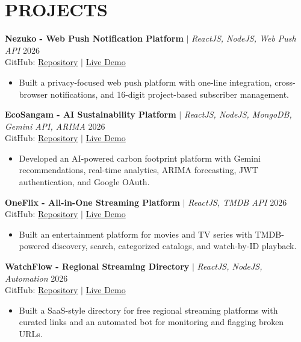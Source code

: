 \documentclass[a4paper,10pt]{article}
\begin{document}
\section*{PROJECTS}

\textbf{Nezuko - Web Push Notification Platform} $|$ \textit{ReactJS, NodeJS, Web Push API} \hfill 2026\\
GitHub: \href{https://github.com/rathod-ramraj/nezukoo}{Repository} $\mid$ \href{https://nezukoo.vercel.app/}{Live Demo}
\begin{itemize}
    \item Built a privacy-focused web push platform with one-line integration, cross-browser notifications, and 16-digit project-based subscriber management.
\end{itemize}

\textbf{EcoSangam - AI Sustainability Platform} $|$ \textit{ReactJS, NodeJS, MongoDB, Gemini API, ARIMA} \hfill 2026\\
GitHub: \href{https://github.com/rathod-ramraj/hackathon}{Repository} $\mid$ \href{https://ecosangam.onrender.com/}{Live Demo}
\begin{itemize}
    \item Developed an AI-powered carbon footprint platform with Gemini recommendations, real-time analytics, ARIMA forecasting, JWT authentication, and Google OAuth.
\end{itemize}

\textbf{OneFlix - All-in-One Streaming Platform} $|$ \textit{ReactJS, TMDB API} \hfill 2026\\
GitHub: \href{https://github.com/rathod-ramraj/yorwatch}{Repository} $\mid$ \href{https://oneflixx.vercel.app/}{Live Demo}
\begin{itemize}
    \item Built an entertainment platform for movies and TV series with TMDB-powered discovery, search, categorized catalogs, and watch-by-ID playback.
\end{itemize}

\textbf{WatchFlow - Regional Streaming Directory} $|$ \textit{ReactJS, NodeJS, Automation} \hfill 2026\\
GitHub: \href{https://github.com/rathod-ramraj/watchflow}{Repository} $\mid$ \href{https://fmwmedia.vercel.app/}{Live Demo}
\begin{itemize}
    \item Built a SaaS-style directory for free regional streaming platforms with curated links and an automated bot for monitoring and flagging broken URLs.
\end{itemize}
\end{document}
